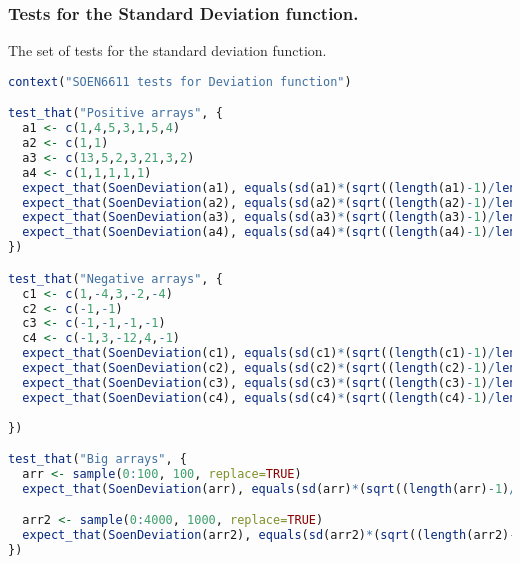\documentclass[12pt]{article}
\begin{document}
\subsubsection{Tests for the Standard Deviation function.}
The set of tests for the standard deviation function.
\begin{lstlisting}[language=R]
context("SOEN6611 tests for Deviation function")

test_that("Positive arrays", {
  a1 <- c(1,4,5,3,1,5,4)
  a2 <- c(1,1)
  a3 <- c(13,5,2,3,21,3,2)
  a4 <- c(1,1,1,1,1)
  expect_that(SoenDeviation(a1), equals(sd(a1)*(sqrt((length(a1)-1)/length(a1)))))
  expect_that(SoenDeviation(a2), equals(sd(a2)*(sqrt((length(a2)-1)/length(a2)))))
  expect_that(SoenDeviation(a3), equals(sd(a3)*(sqrt((length(a3)-1)/length(a3)))))
  expect_that(SoenDeviation(a4), equals(sd(a4)*(sqrt((length(a4)-1)/length(a4)))))
})

test_that("Negative arrays", {
  c1 <- c(1,-4,3,-2,-4)
  c2 <- c(-1,-1)
  c3 <- c(-1,-1,-1,-1)
  c4 <- c(-1,3,-12,4,-1)
  expect_that(SoenDeviation(c1), equals(sd(c1)*(sqrt((length(c1)-1)/length(c1)))))
  expect_that(SoenDeviation(c2), equals(sd(c2)*(sqrt((length(c2)-1)/length(c2)))))
  expect_that(SoenDeviation(c3), equals(sd(c3)*(sqrt((length(c3)-1)/length(c3)))))
  expect_that(SoenDeviation(c4), equals(sd(c4)*(sqrt((length(c4)-1)/length(c4)))))
  
})

test_that("Big arrays", {
  arr <- sample(0:100, 100, replace=TRUE)
  expect_that(SoenDeviation(arr), equals(sd(arr)*(sqrt((length(arr)-1)/length(arr)))))

  arr2 <- sample(0:4000, 1000, replace=TRUE)
  expect_that(SoenDeviation(arr2), equals(sd(arr2)*(sqrt((length(arr2)-1)/length(arr2)))))
})
\end{lstlisting}

\end{document}
